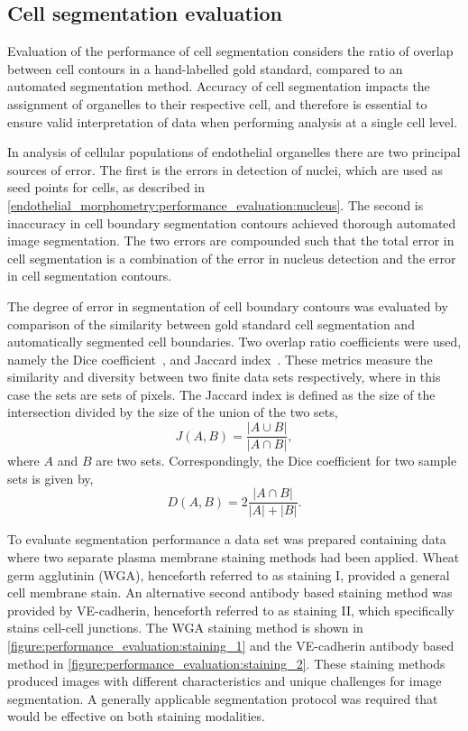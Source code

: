 \subsection{Cell segmentation evaluation}
\label{endothelial_morphometry:performance_evaluation:cell}
Evaluation of the performance of cell segmentation considers the ratio of overlap between cell contours in a hand-labelled gold standard, compared to an automated segmentation method. Accuracy of cell segmentation impacts the assignment of organelles to their respective cell, and therefore is essential to ensure valid interpretation of data when performing analysis at a single cell level.

In analysis of cellular populations of endothelial organelles there are two principal sources of error. The first is the errors in detection of nuclei, which are used as seed points for cells, as described in \autoref{endothelial_morphometry:performance_evaluation:nucleus}. The second is inaccuracy in cell boundary segmentation contours achieved thorough automated image segmentation. The two errors are compounded such that the total error in cell segmentation is a combination of the error in nucleus detection and the error in cell segmentation contours.

The degree of error in segmentation of cell boundary contours was evaluated by comparison of the similarity between gold standard cell segmentation and automatically segmented cell boundaries. Two overlap ratio coefficients were used, namely the Dice coefficient~\cite{Dice1945}, and Jaccard index~\cite{Jaccard1912}. These metrics measure the similarity and diversity between two finite data sets respectively, where in this case the sets are sets of pixels. The Jaccard index is defined as the size of the intersection divided by the size of the union of the two sets,
\begin{equation}
J(A,B) = \frac{|A\cup B|}{|A \cap B|} ,
\end{equation}
where $A$ and $B$ are two sets. Correspondingly, the Dice coefficient for two sample sets is given by,
\begin{equation}
D(A,B) = 2 \frac{|A\cap B|}{|A| + |B|}.
\end{equation}

To evaluate segmentation performance a data set was prepared containing data where two separate plasma membrane staining methods had been applied. Wheat germ agglutinin (WGA), henceforth referred to as staining I, provided a general cell membrane stain. An alternative second antibody based staining method was provided by VE-cadherin, henceforth referred to as staining II, which specifically stains cell-cell junctions. The WGA staining method is shown in \autoref{figure:performance_evaluation:staining_1} and the VE-cadherin antibody based method in \autoref{figure:performance_evaluation:staining_2}. These staining methods produced images with different characteristics and unique challenges for image segmentation. A generally applicable segmentation protocol was required that would be effective on both staining modalities.

